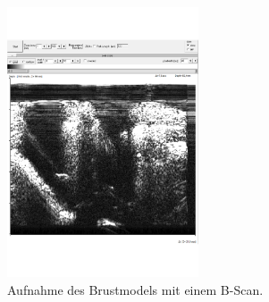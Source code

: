   \begin{figure}[H]
    \centering
    \includegraphics[height=8cm]{content/pics/B-Scan_Brust.pdf}
    \caption{Aufnahme des Brustmodels mit einem B-Scan.}
    \label{fig:B-Scan Brust}
  \end{figure}
  
  
  
  
  
  
  
  
  
  
  
  
  
  
  
  
  
  
  
  
  
  
  
  
  
  
  
  
  
  
  
  
  
  
  
  
  
  
  
  



































